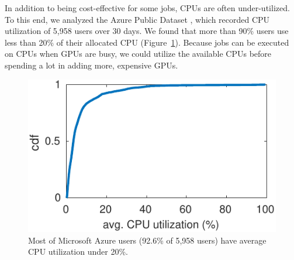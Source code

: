 
In addition to being cost-effective for some jobs, CPUs are often under-utilized.
To this end, we analyzed the Azure Public Dataset \cite{AzurePublicDataset}, which recorded CPU utilization of 5,958 users over 30 days.
We found that more than 90\% users use less than 20\% of their allocated CPU (Figure~\ref{fig:avg_util}).
Because jobs can be executed on CPUs when GPUs are busy, we could utilize the available CPUs before spending a lot in adding more, expensive GPUs.

\begin{figure}[h]
	\centering
	\includegraphics[width=0.8\linewidth]{figs/avg_util}
	\caption{Most of Microsoft Azure users (92.6\% of 5,958 users) have average CPU utilization under 20\%.}
	\label{fig:avg_util}
\end{figure}






